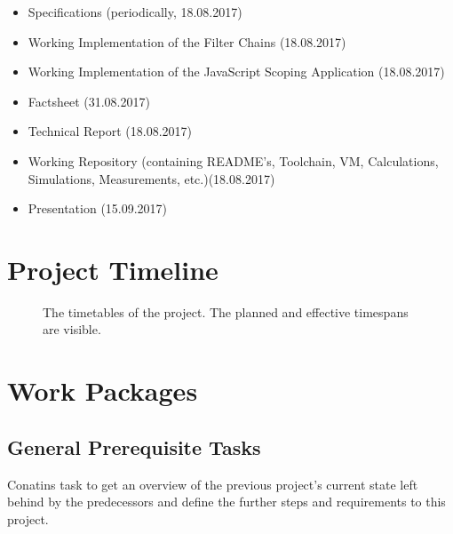 \documentclass[a4paper,oneside]{alpenspecs/alpenspecs}
\begin{document}
\begin{itemize}
    \item Specifications (periodically, 18.08.2017)
    \item Working Implementation of the Filter Chains (18.08.2017)
    \item Working Implementation of the JavaScript Scoping Application (18.08.2017)
    \item Factsheet (31.08.2017)
    \item Technical Report (18.08.2017)
    \item Working Repository (containing README's, Toolchain, VM, Calculations, Simulations, Measurements, etc.)(18.08.2017)
    \item Presentation (15.09.2017)
\end{itemize}

\chapter{Project Timeline} %
\label{ch:initial}

\begin{a3pages} %
    \begin{figure}
        \centering
        
        \caption{The timetables of the project. The planned and effective timespans are visible.}
    \end{figure}
\end{a3pages}

\chapter{Work Packages} %
\label{ch:wpac}


\section{General Prerequisite Tasks}
\label{sec:general}

Conatins task to get an overview of the previous project's current state left behind by the predecessors and define the further steps and requirements to this project.
\end{document}
